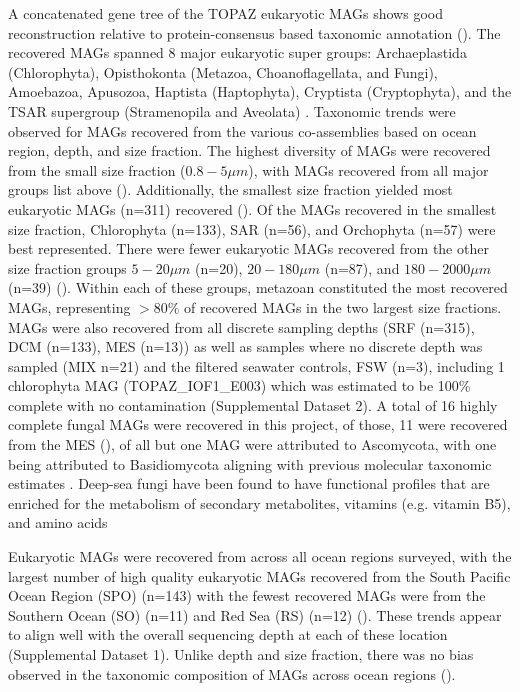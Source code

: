 \documentclass[12pt]{article}
\numberwithin{equation}{section}
\begin{document}
A concatenated gene tree of the TOPAZ eukaryotic MAGs shows good reconstruction relative to protein-consensus based taxonomic annotation (). The recovered MAGs spanned 8 major eukaryotic super groups: Archaeplastida (Chlorophyta), Opisthokonta (Metazoa, Choanoflagellata, and Fungi), Amoebazoa, Apusozoa, Haptista (Haptophyta), Cryptista (Cryptophyta), and the TSAR supergroup (Stramenopila and Aveolata) \citep{Burki_2020}. Taxonomic trends were observed for MAGs recovered from the various co-assemblies based on ocean region, depth, and size fraction. The highest diversity of MAGs were recovered from the small size fraction ($0.8-5 \mu m$), with MAGs recovered from all major groups list above (). Additionally, the smallest size fraction yielded most eukaryotic MAGs (n=311) recovered (). Of the MAGs recovered in the smallest size fraction,  Chlorophyta (n=133), SAR (n=56), and Orchophyta (n=57) were best represented. There were fewer eukaryotic MAGs recovered from the other size fraction groups $5-20\mu m$ (n=20), $20-180 \mu m$ (n=87), and $180-2000\mu m$ (n=39) (). Within each of these groups, metazoan constituted the most recovered MAGs, representing $>80\%$ of recovered MAGs in the two largest size fractions. MAGs were also recovered from all discrete sampling depths (SRF (n=315), DCM (n=133), MES (n=13)) as well as samples where no discrete depth was sampled (MIX n=21) and the filtered seawater controls, FSW (n=3), including 1 chlorophyta MAG (TOPAZ\_IOF1\_E003) which was estimated to be 100\% complete with no contamination (Supplemental Dataset 2). A total of 16 highly complete fungal MAGs were recovered in this project, of those, 11 were recovered from the MES (), of all but one MAG were attributed to Ascomycota, with one being attributed to Basidiomycota aligning with previous molecular taxonomic estimates \citep{Morales_2019,Pernice_2015,Edgcomb_2010}. Deep-sea fungi have been found to have functional profiles that are enriched for the metabolism of secondary metabolites, vitamins (e.g. vitamin B5), and amino acids \citep{Morales_2019,DAMARE2006172} 

Eukaryotic MAGs were recovered from across all ocean regions surveyed, with the largest number of high quality eukaryotic MAGs recovered from the South Pacific Ocean Region (SPO) (n=143) with the fewest recovered MAGs were from the Southern Ocean (SO) (n=11) and Red Sea (RS) (n=12) (). These trends appear to align well with the overall sequencing depth at each of these location (Supplemental Dataset 1). Unlike depth and size fraction, there was no bias observed in the taxonomic composition of MAGs across ocean regions (). 
\end{document}
